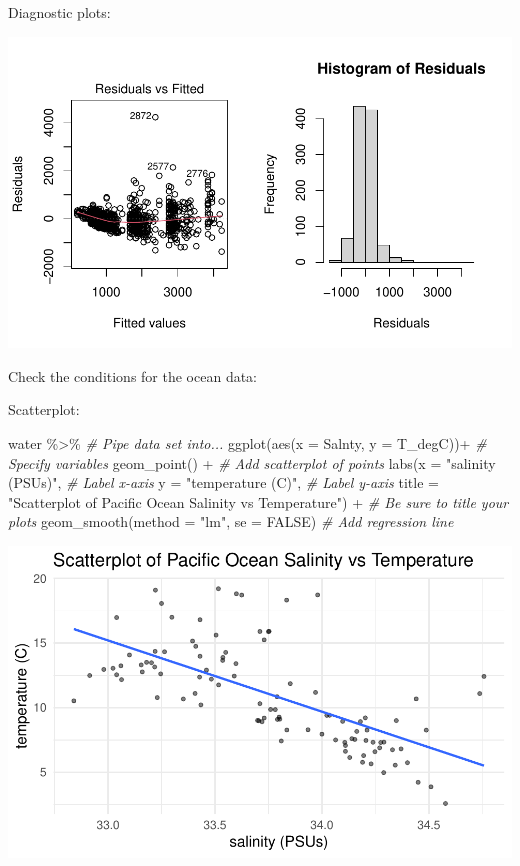 \documentclass[
]{report}
\newenvironment{Shaded}{\begin{snugshade}}{\end{snugshade}}
\newcommand{\AttributeTok}[1]{\textcolor[rgb]{0.77,0.63,0.00}{#1}}
\newcommand{\CommentTok}[1]{\textcolor[rgb]{0.56,0.35,0.01}{\textit{#1}}}
\newcommand{\ConstantTok}[1]{\textcolor[rgb]{0.00,0.00,0.00}{#1}}
\newcommand{\FunctionTok}[1]{\textcolor[rgb]{0.00,0.00,0.00}{#1}}
\newcommand{\NormalTok}[1]{#1}
\newcommand{\SpecialCharTok}[1]{\textcolor[rgb]{0.00,0.00,0.00}{#1}}
\newcommand{\StringTok}[1]{\textcolor[rgb]{0.31,0.60,0.02}{#1}}
\begin{document}
Diagnostic plots:

\begin{center}\includegraphics[width=0.7\linewidth]{13-LN013-regression_files/figure-latex/unnamed-chunk-9-1} \end{center}

Check the conditions for the ocean data:

Scatterplot:

\begin{Shaded}
\begin{Highlighting}[]
\NormalTok{water }\SpecialCharTok{\%\textgreater{}\%} \CommentTok{\# Pipe data set into...}
\FunctionTok{ggplot}\NormalTok{(}\FunctionTok{aes}\NormalTok{(}\AttributeTok{x =}\NormalTok{ Salnty, }\AttributeTok{y =}\NormalTok{ T\_degC))}\SpecialCharTok{+}  \CommentTok{\# Specify variables}
  \FunctionTok{geom\_point}\NormalTok{() }\SpecialCharTok{+}  \CommentTok{\# Add scatterplot of points}
  \FunctionTok{labs}\NormalTok{(}\AttributeTok{x =} \StringTok{"salinity (PSUs)"}\NormalTok{,  }\CommentTok{\# Label x{-}axis}
       \AttributeTok{y =} \StringTok{"temperature (C)"}\NormalTok{,  }\CommentTok{\# Label y{-}axis}
       \AttributeTok{title =} \StringTok{"Scatterplot of Pacific Ocean Salinity vs Temperature"}\NormalTok{) }\SpecialCharTok{+} 
               \CommentTok{\# Be sure to title your plots}
  \FunctionTok{geom\_smooth}\NormalTok{(}\AttributeTok{method =} \StringTok{"lm"}\NormalTok{, }\AttributeTok{se =} \ConstantTok{FALSE}\NormalTok{)  }\CommentTok{\# Add regression line}
\end{Highlighting}
\end{Shaded}

\begin{center}\includegraphics[width=0.7\linewidth]{13-LN013-regression_files/figure-latex/unnamed-chunk-10-1} \end{center}
\end{document}
